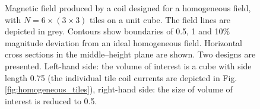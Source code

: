 \begin{figure}
  \centering
  \quad
  \caption{Magnetic field produced by a coil designed for a homogeneous field, with $N = 6 \times (3 \times 3)$ tiles on a unit cube. The field lines are depicted in grey. Contours show boundaries of 0.5, 1 and 10\% magnitude deviation from an ideal homogeneous field. Horizontal cross sections in the middle--height plane are shown. Two designs are presented. Left-hand side: the volume of interest is a cube with side length 0.75 (the individual tile coil currents are depicted in Fig.\,\ref{fig:homogeneous_tiles}), right-hand side: the size of volume of interest is reduced to 0.5.}
  \label{fig:homogeneous_performance}
\end{figure}

